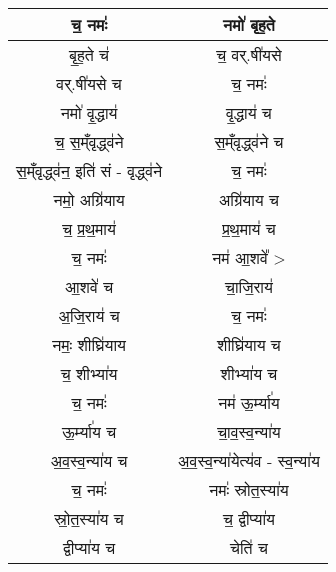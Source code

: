 {\begin{longtable}{|c|c|}
\hline
च॒ नमः॑                    & नमो॑ बृह॒ते\\
\hline
बृ॒ह॒ते च॑                    & च॒ वर्.षी॑यसे\\
\hline
वर्.षी॑यसे च                & च॒ नमः॑\\
\hline
नमो॑ वृ॒द्धाय॑                & वृ॒द्धाय॑ च\\
\hline
च॒ स॒म्ँवृद्ध्व॑ने                & स॒म्ँवृद्ध्व॑ने च\\
\hline
स॒म्ँवृद्ध्व॑न॒ इति॑ सं - वृद्ध्व॑ने    & च॒ नमः॑\\
\hline
नमो॒ अग्रि॑याय              & अग्रि॑याय च\\
\hline
च॒ प्र॒थ॒माय॑                 & प्र॒थ॒माय॑ च\\
\hline
च॒ नमः॑                    & नम॑ आ॒शवे᳚ >\\
\hline
आ॒शवे॑ च                    & चा॒जि॒राय॑\\
\hline
अ॒जि॒राय॑ च                 & च॒ नमः॑\\
\hline
नमः॒ शीघ्रि॑याय             & शीघ्रि॑याय च\\
\hline
च॒ शीभ्या॑य                 & शीभ्या॑य च\\
\hline
च॒ नमः॑                    & नम॑ ऊ॒र्म्या॑य\\
\hline
ऊ॒र्म्या॑य च                 & चा॒व॒स्व॒न्या॑य\\
\hline
अ॒व॒स्व॒न्या॑य च               & अ॒व॒स्व॒न्या॑येत्य॑व - स्व॒न्या॑य\\
\hline
च॒ नमः॑                    & नमः॑ स्रोत॒स्या॑य\\
\hline
स्रो॒त॒स्या॑य च               & च॒ द्वीप्या॑य\\
\hline
द्वीप्या॑य च                & चेति॑ च\\
\hline
\end{longtable}
}
